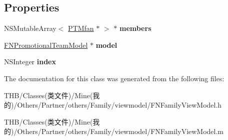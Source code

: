 \subsection*{Properties}
\begin{DoxyCompactItemize}
\item 
\mbox{\label{interface_f_n_family_view_model_ae139d432b9fe6bde6a8d8c63b4acc0b0}} 
N\+S\+Mutable\+Array$<$ \mbox{\hyperlink{interface_p_t_mfan}{P\+T\+Mfan}} $\ast$ $>$ $\ast$ {\bfseries members}
\item 
\mbox{\label{interface_f_n_family_view_model_ab13507102d25c72326b5ab205b6fb00d}} 
\mbox{\hyperlink{interface_f_n_promotional_team_model}{F\+N\+Promotional\+Team\+Model}} $\ast$ {\bfseries model}
\item 
\mbox{\label{interface_f_n_family_view_model_a8d7325cfd5609f649b51b7254fd40256}} 
N\+S\+Integer {\bfseries index}
\end{DoxyCompactItemize}


The documentation for this class was generated from the following files\+:\begin{DoxyCompactItemize}
\item 
T\+H\+B/\+Classes(类文件)/\+Mine(我的)/\+Others/\+Partner/others/\+Family/viewmodel/F\+N\+Family\+View\+Model.\+h\item 
T\+H\+B/\+Classes(类文件)/\+Mine(我的)/\+Others/\+Partner/others/\+Family/viewmodel/F\+N\+Family\+View\+Model.\+m\end{DoxyCompactItemize}
